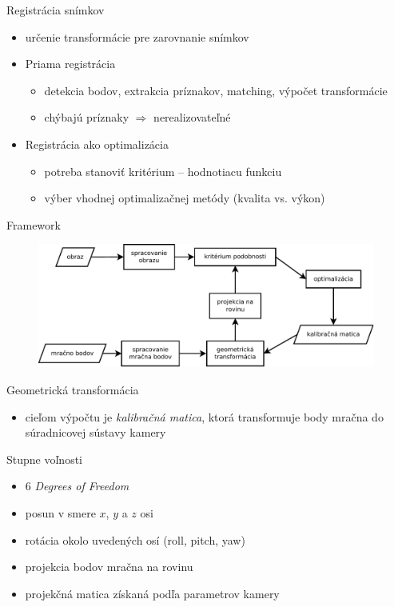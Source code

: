\documentclass[pdf]{beamer}
\begin{document}
	\begin{frame}{Registrácia snímkov}
		\begin{itemize}
			\item určenie transformácie pre zarovnanie snímkov 
			\item Priama registrácia 
			\begin{itemize}
				\item detekcia bodov, extrakcia príznakov, matching, výpočet transformácie
				\item chýbajú príznaky $\Rightarrow$ nerealizovateľné
			\end{itemize}
			
			\item Registrácia ako optimalizácia
			\begin{itemize}
				\item potreba stanoviť kritérium -- hodnotiacu funkciu
				\item výber vhodnej optimalizačnej metódy (kvalita vs. výkon)
			\end{itemize}
		\end{itemize}
	\end{frame}
	
	\begin{frame}{Framework}
		\begin{figure}[h]
			\center
			\includegraphics[width=0.99\textwidth]{framework.pdf}
		\end{figure}
	\end{frame}
	
	\begin{frame}{Geometrická transformácia}
		\begin{itemize}
			\item cieľom výpočtu je \emph{kalibračná matica}, ktorá transformuje body mračna do súradnicovej sústavy kamery
		\end{itemize}

		\begin{block}{Stupne voľnosti}
			\begin{itemize}
				\item $6$ \emph{Degrees of Freedom}
				\item posun v smere $x$, $y$ a $z$ osi
				\item rotácia okolo uvedených osí (roll, pitch, yaw)
			\end{itemize}
		\end{block}

		\begin{itemize}
			\item projekcia bodov mračna na rovinu 
			\item projekčná matica získaná podľa parametrov kamery
		\end{itemize}
	\end{frame}
	
\end{document}
